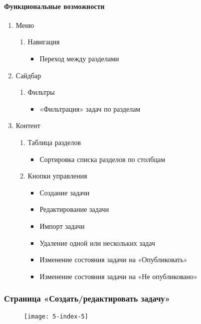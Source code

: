\paragraph{Функциональные возможности}
\begin{enumerate}
	\item Меню
	\begin{enumerate}
		\item Навигация
		\begin{itemize}
			\item Переход между разделами
		\end{itemize}
	\end{enumerate}

	\item Сайдбар
	\begin{enumerate}
		\item Фильтры
		\begin{itemize}
			\item «Фильтрация» задач по разделам
		\end{itemize}
	\end{enumerate}

	\item Контент
	\begin{enumerate}
		\item Таблица разделов
		\begin{itemize}
			\item Сортировка списка разделов по столбцам
		\end{itemize}

		\item Кнопки управления
		\begin{itemize}
			\item Создание задачи
			\item Редактирование задачи
			\item Импорт задачи
			\item Удаление одной или нескольких задач
			\item Изменение состояния задачи на «Опубликовать»
			\item Изменение состояния задачи на «Не опубликовано»
		\end{itemize}
	\end{enumerate}
\end{enumerate}

\subsubsection{Страница «Создать/редактировать задачу»}
\begin{figure}[H]
\texttt{[image: 5-index-5]}
\end{figure}

